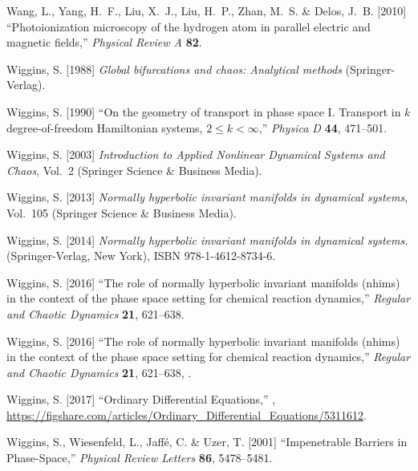 \documentclass{ws-ijbc}
\begin{document}
\begin{thebibliography}{76}
	Wang, L., Yang, H.~F., Liu, X.~J., Liu, H.~P., Zhan, M.~S. \& Delos, J.~B.
	[2010] \enquote{Photoionization microscopy of the hydrogen atom in parallel
		electric and magnetic fields,} \emph{Physical Review A} \textbf{82}.
	
	Wiggins, S. [1988] \emph{Global bifurcations and chaos: Analytical methods}
	(Springer-Verlag).
	
	Wiggins, S. [1990] \enquote{On the geometry of transport in phase space {I}.
		{T}ransport in $k$ degree-of-freedom {H}amiltonian systems, $2 \le k <
		\infty$,} \emph{Physica D} \textbf{44},  471--501.
	
	Wiggins, S. [2003] \emph{Introduction to Applied Nonlinear Dynamical Systems
		and Chaos}, Vol.~2 (Springer Science \& Business Media).
	
	Wiggins, S. [2013] \emph{Normally hyperbolic invariant manifolds in dynamical
		systems}, Vol.~105 (Springer Science \& Business Media).
	
	Wiggins, S. [2014] \emph{Normally hyperbolic invariant manifolds in dynamical
		systems.} (Springer-Verlag, New York), ISBN 978-1-4612-8734-6.
	
	Wiggins, S. [2016{}] \enquote{The role of normally hyperbolic
		invariant manifolds (nhims) in the context of the phase space setting for
		chemical reaction dynamics,} \emph{Regular and Chaotic Dynamics} \textbf{21},
	621--638.
	
	Wiggins, S. [2016{}] \enquote{The role of normally hyperbolic
		invariant manifolds (nhims) in the context of the phase space setting for
		chemical reaction dynamics,} \emph{Regular and Chaotic Dynamics} \textbf{21},
	621--638, .
	
	Wiggins, S. [2017] \enquote{{Ordinary Differential Equations},}
	,
	\urlprefix\url{https://figshare.com/articles/Ordinary_Differential_Equations/5311612}.
	
	Wiggins, S., Wiesenfeld, L., Jaffé, C. \& Uzer, T. [2001{}]
	\enquote{Impenetrable {Barriers} in {Phase}-{Space},} \emph{Physical Review
		Letters} \textbf{86},  5478--5481.
	

\end{thebibliography}
\end{document}
